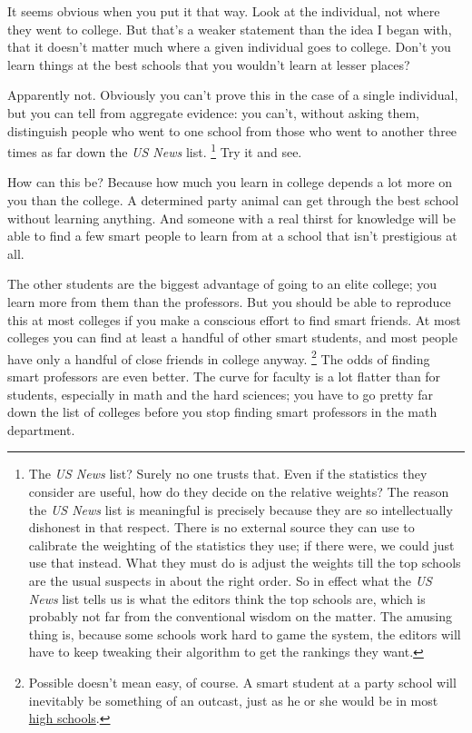 It seems obvious when you put it that way. Look at the individual, not
where they went to college. But that's a weaker statement than the idea
I began with, that it doesn't matter much where a given individual goes
to college. Don't you learn things at the best schools that you wouldn't
learn at lesser places?

Apparently not. Obviously you can't prove this in the case of a single
individual, but you can tell from aggregate evidence: you can't, without
asking them, distinguish people who went to one school from those who
went to another three times as far down the \emph{US News} list.
\footnote{The \emph{US News} list? Surely no one trusts that. Even if the
statistics they consider are useful, how do they decide on the relative
weights? The reason the \emph{US News} list is meaningful is precisely
because they are so intellectually dishonest in that respect. There is
no external source they can use to calibrate the weighting of the
statistics they use; if there were, we could just use that instead. What
they must do is adjust the weights till the top schools are the usual
suspects in about the right order. So in effect what the \emph{US News}
list tells us is what the editors think the top schools are, which is
probably not far from the conventional wisdom on the matter. The amusing
thing is, because some schools work hard to game the system, the editors
will have to keep tweaking their algorithm to get the rankings they
want.} Try it and see.

How can this be? Because how much you learn in college depends a lot
more on you than the college. A determined party animal can get through
the best school without learning anything. And someone with a real
thirst for knowledge will be able to find a few smart people to learn
from at a school that isn't prestigious at all.

The other students are the biggest advantage of going to an elite
college; you learn more from them than the professors. But you should be
able to reproduce this at most colleges if you make a conscious effort
to find smart friends. At most colleges you can find at least a handful
of other smart students, and most people have only a handful of close
friends in college anyway. \footnote{Possible doesn't mean easy, of course. A smart student at a
party school will inevitably be something of an outcast, just as he or
she would be in most \href{nerds.html}{high schools}.} The odds of finding
smart professors are even better. The curve for faculty is a lot flatter
than for students, especially in math and the hard sciences; you have to
go pretty far down the list of colleges before you stop finding smart
professors in the math department.


